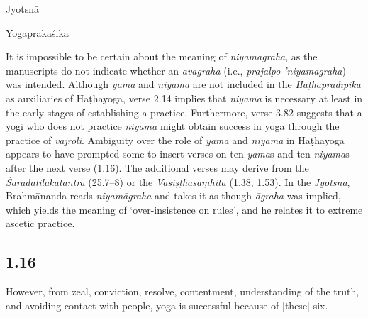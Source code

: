 \begin{ekdosis}
\begin{testimonia}[hp01_015]
\begin{versinnote}
\end{versinnote}

Jyotsnā

\begin{versinnote}
\end{versinnote}

Yogaprakāśikā

\begin{versinnote}
\end{versinnote}

\end{testimonia}

\begin{philcomm}[hp01_015]        
It is impossible to be certain about the meaning of \emph{niyamagraha}, as the manuscripts do not indicate whether an \emph{avagraha} (i.e., \emph{prajalpo ’niyamagraha}) was intended. Although \emph{yama} and \emph{niyama} are not included in the \emph{Haṭhapradīpikā} as auxiliaries of Haṭhayoga, verse 2.14 implies that \emph{niyama} is necessary at least in the early stages of establishing a practice. Furthermore, verse 3.82 suggests that a yogi who does not practice \emph{niyama} might obtain success in yoga through the practice of \textit{vajroli}. Ambiguity over the role of \emph{yama} and \emph{niyama} in Haṭhayoga appears to have prompted some to insert verses on ten \emph{yama}s and ten \emph{niyama}s after the next verse (1.16). The additional verses may derive from the \emph{Śāradātilakatantra} (25.7–8) or the  \emph{Vasiṣṭhasaṃhitā} (1.38, 1.53). In the \emph{Jyotsnā}, Brahmānanda reads \emph{niyamāgraha} and takes it as though \emph{āgraha} was implied, which yields the meaning of ‘over-insistence on rules’, and he relates it to extreme ascetic practice.
\end{philcomm}

\subsection*{1.16}
\begin{translation}[hp01_016]
However, from zeal, conviction, resolve, contentment, understanding of the truth, and avoiding contact with people, yoga is successful because of [these] six.
\end{translation}


\end{ekdosis}
